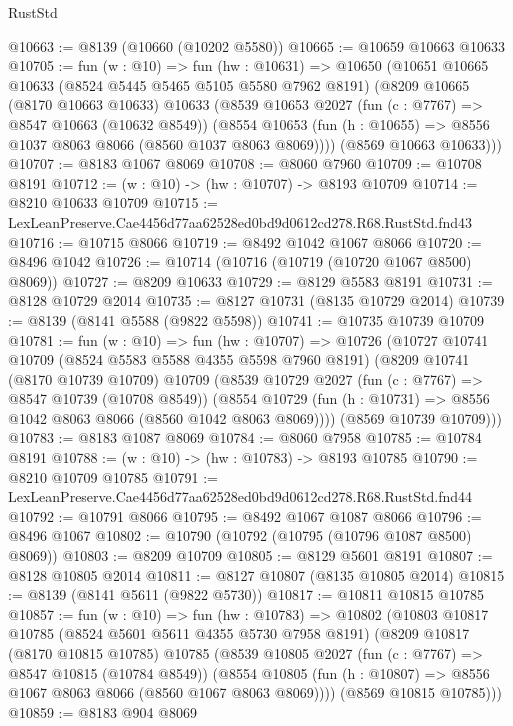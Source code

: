 \begin{lexlean}{RustStd}
\begin{coremodule}
@10663 := @8139 (@10660 (@10202 @5580))
@10665 := @10659 @10663 @10633
@10705 := fun (w : @10) =>
  fun (hw : @10631) =>
  @10650
    (@10651
      @10665
      @10633
      (@8524 @5445 @5465 @5105 @5580 @7962 @8191)
      (@8209
        @10665
        (@8170 @10663 @10633)
        @10633
        (@8539
          @10653
          @2027
          (fun (c : @7767) => @8547 @10663 (@10632 @8549))
          (@8554 @10653 (fun (h : @10655) => @8556 @1037 @8063 @8066 (@8560 @1037 @8063 @8069))))
        (@8569 @10663 @10633)))
@10707 := @8183 @1067 @8069
@10708 := @8060 @7960
@10709 := @10708 @8191
@10712 := (w : @10) -> (hw : @10707) -> @8193 @10709
@10714 := @8210 @10633 @10709
@10715 := LexLeanPreserve.Cae4456d77aa62528ed0bd9d0612cd278.R68.RustStd.fnd43
@10716 := @10715 @8066
@10719 := @8492 @1042 @1067 @8066
@10720 := @8496 @1042
@10726 := @10714 (@10716 (@10719 (@10720 @1067 @8500) @8069))
@10727 := @8209 @10633
@10729 := @8129 @5583 @8191
@10731 := @8128 @10729 @2014
@10735 := @8127 @10731 (@8135 @10729 @2014)
@10739 := @8139 (@8141 @5588 (@9822 @5598))
@10741 := @10735 @10739 @10709
@10781 := fun (w : @10) =>
  fun (hw : @10707) =>
  @10726
    (@10727
      @10741
      @10709
      (@8524 @5583 @5588 @4355 @5598 @7960 @8191)
      (@8209
        @10741
        (@8170 @10739 @10709)
        @10709
        (@8539
          @10729
          @2027
          (fun (c : @7767) => @8547 @10739 (@10708 @8549))
          (@8554 @10729 (fun (h : @10731) => @8556 @1042 @8063 @8066 (@8560 @1042 @8063 @8069))))
        (@8569 @10739 @10709)))
@10783 := @8183 @1087 @8069
@10784 := @8060 @7958
@10785 := @10784 @8191
@10788 := (w : @10) -> (hw : @10783) -> @8193 @10785
@10790 := @8210 @10709 @10785
@10791 := LexLeanPreserve.Cae4456d77aa62528ed0bd9d0612cd278.R68.RustStd.fnd44
@10792 := @10791 @8066
@10795 := @8492 @1067 @1087 @8066
@10796 := @8496 @1067
@10802 := @10790 (@10792 (@10795 (@10796 @1087 @8500) @8069))
@10803 := @8209 @10709
@10805 := @8129 @5601 @8191
@10807 := @8128 @10805 @2014
@10811 := @8127 @10807 (@8135 @10805 @2014)
@10815 := @8139 (@8141 @5611 (@9822 @5730))
@10817 := @10811 @10815 @10785
@10857 := fun (w : @10) =>
  fun (hw : @10783) =>
  @10802
    (@10803
      @10817
      @10785
      (@8524 @5601 @5611 @4355 @5730 @7958 @8191)
      (@8209
        @10817
        (@8170 @10815 @10785)
        @10785
        (@8539
          @10805
          @2027
          (fun (c : @7767) => @8547 @10815 (@10784 @8549))
          (@8554 @10805 (fun (h : @10807) => @8556 @1067 @8063 @8066 (@8560 @1067 @8063 @8069))))
        (@8569 @10815 @10785)))
@10859 := @8183 @904 @8069

\end{coremodule}
\end{lexlean}
